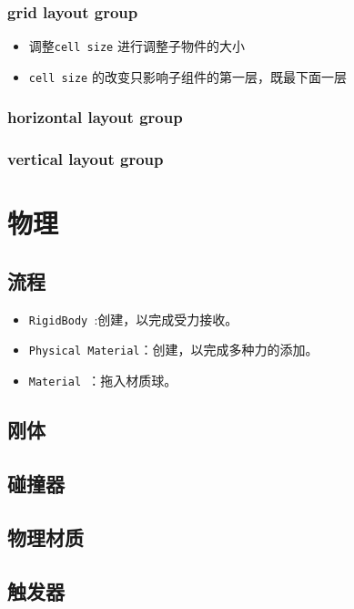\documentclass[UTF8,a4paper,12pt]{ctexbook}
\begin{document}
		\subsection{grid layout group}
			\begin{itemize}
				\item  调整\verb|cell size| 进行调整子物件的大小
				\item  \verb|cell size| 的改变只影响子组件的第一层，既最下面一层
			\end{itemize}
		
		\subsection{horizontal layout group}
		
		\subsection{vertical layout group}

\chapter{物理}
	\section{流程}
		\begin{itemize}
			\item \verb|RigidBody |:创建，以完成受力接收。
			\item \verb|Physical Material|：创建，以完成多种力的添加。
			\item \verb|Material |：拖入材质球。
		\end{itemize}
	
	\section{刚体}
	
	
	\section{碰撞器}
	
	
	\section{物理材质}
	
	
	\section{触发器}
	
\end{document}
